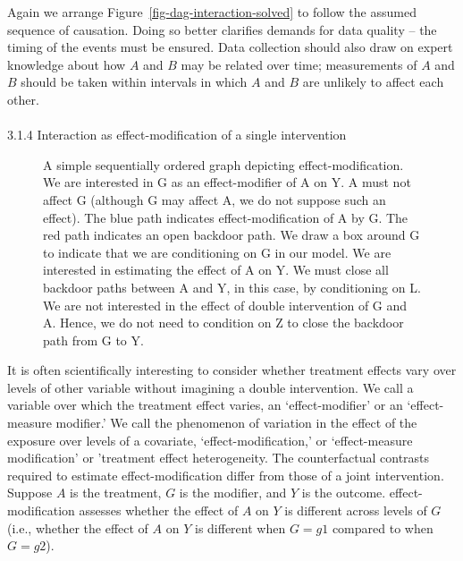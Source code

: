 \documentclass[
  singlecolumn]{article}
\makeatletter
\let\oldparagraph\paragraph
\renewcommand{\paragraph}{
    \@ifstar
      \xxxParagraphStar
      \xxxParagraphNoStar
  }
\newcommand{\xxxParagraphStar}[1]{\oldparagraph*{#1}\mbox{}}
\newcommand{\xxxParagraphNoStar}[1]{\oldparagraph{#1}\mbox{}}
\makeatother
\begin{document}
Again we arrange Figure~\ref{fig-dag-interaction-solved} to follow the
assumed sequence of causation. Doing so better clarifies demands for
data quality -- the timing of the events must be ensured. Data
collection should also draw on expert knowledge about how \(A\) and
\(B\) may be related over time; measurements of \(A\) and \(B\) should
be taken within intervals in which \(A\) and \(B\) are unlikely to
affect each other.

\paragraph{3.1.4 Interaction as effect-modification of a single
intervention}\label{interaction-as-effect-modification-of-a-single-intervention}

\begin{figure}


\caption{\label{fig-dag-effect-modification}A simple sequentially
ordered graph depicting effect-modification. We are interested in G as
an effect-modifier of A on Y. A must not affect G (although G may affect
A, we do not suppose such an effect). The blue path indicates
effect-modification of A by G. The red path indicates an open backdoor
path. We draw a box around G to indicate that we are conditioning on G
in our model. We are interested in estimating the effect of A on Y. We
must close all backdoor paths between A and Y, in this case, by
conditioning on L. We are not interested in the effect of double
intervention of G and A. Hence, we do not need to condition on Z to
close the backdoor path from G to Y.}

\end{figure}%

It is often scientifically interesting to consider whether treatment
effects vary over levels of other variable without imagining a double
intervention. We call a variable over which the treatment effect varies,
an `effect-modifier' or an `effect-measure modifier.' We call the
phenomenon of variation in the effect of the exposure over levels of a
covariate, `effect-modification,' or `effect-measure modification' or
'treatment effect heterogeneity. The counterfactual contrasts required
to estimate effect-modification differ from those of a joint
intervention. Suppose \(A\) is the treatment, \(G\) is the modifier, and
\(Y\) is the outcome. effect-modification assesses whether the effect of
\(A\) on \(Y\) is different across levels of \(G\) (i.e., whether the
effect of \(A\) on \(Y\) is different when \(G = g1\) compared to when
\(G = g2\)).
\end{document}
